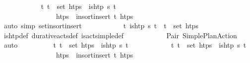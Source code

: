 \begin{isabellebody}
\ \ \ \ \ \ \ \ \ \ \isamarkupfalse%
\ {\isacartoucheopen}{\isasymforall}t{\isachardot}{\kern0pt}\ t\ {\isasymin}\ set\ htps{\isacharprime}{\kern0pt}\ {\isasymlongleftrightarrow}\ is{\isacharunderscore}{\kern0pt}htp\ {\isasympi}s\ t{\isacartoucheclose}\ \isanewline
\ \ \ \ \ \ \ \ \ \ \ \ \ \ \ \ {\isacartoucheopen}htps\ {\isacharequal}{\kern0pt}\ insort{\isacharunderscore}{\kern0pt}insert\ t\isactrlsub {\isasympi}\ htps{\isacharprime}{\kern0pt}{\isacartoucheclose}\ \isanewline
\ \ \ \ \ \ \ \ \ \ \isamarkupfalse%
\ {\isacharparenleft}{\kern0pt}auto\ simp{\isacharcolon}{\kern0pt}\ set{\isacharunderscore}{\kern0pt}insort{\isacharunderscore}{\kern0pt}insert{\isacharparenright}{\kern0pt}\isanewline
\ \ \ \ \ \ \ \ \isamarkupfalse%
\ \isamarkupfalse%
\ {\isachardoublequoteopen}{\isasymforall}t{\isachardot}{\kern0pt}\ is{\isacharunderscore}{\kern0pt}htp\ {\isacharparenleft}{\kern0pt}{\isasympi}{\isacharhash}{\kern0pt}{\isasympi}s{\isacharparenright}{\kern0pt}\ t\ {\isasymlongrightarrow}\ t\ {\isasymin}\ set\ htps{\isachardoublequoteclose}\isanewline
\ \ \ \ \ \ \ \ \ \ \isamarkupfalse%
\ is{\isacharunderscore}{\kern0pt}htp{\isacharunderscore}{\kern0pt}def\ durative{\isacharunderscore}{\kern0pt}acts{\isacharunderscore}{\kern0pt}def\ is{\isacharunderscore}{\kern0pt}act{\isacharunderscore}{\kern0pt}simple{\isacharunderscore}{\kern0pt}def\isanewline
\ \ \ \ \ \ \ \ \ \ \isamarkupfalse%
\ Pair\ Simple{\isacharunderscore}{\kern0pt}Plan{\isacharunderscore}{\kern0pt}Action\ \isamarkupfalse%
\ auto\isanewline
\ \ \ \ \ \ \ \ \isamarkupfalse%
\ {\isachardoublequoteopen}{\isasymforall}t{\isachardot}{\kern0pt}\ t\ {\isasymin}\ set\ htps\ {\isasymlongrightarrow}\ is{\isacharunderscore}{\kern0pt}htp\ {\isacharparenleft}{\kern0pt}{\isasympi}{\isacharhash}{\kern0pt}{\isasympi}s{\isacharparenright}{\kern0pt}\ t{\isachardoublequoteclose}\isanewline
\ \ \ \ \ \ \ \ \ \ \isamarkupfalse%
\ {\isacartoucheopen}{\isasymforall}t{\isachardot}{\kern0pt}\ t\ {\isasymin}\ set\ htps{\isacharprime}{\kern0pt}\ {\isasymlongrightarrow}\ is{\isacharunderscore}{\kern0pt}htp\ {\isacharparenleft}{\kern0pt}{\isasympi}{\isacharhash}{\kern0pt}{\isasympi}s{\isacharparenright}{\kern0pt}\ t{\isacartoucheclose}\ \isanewline
\ \ \ \ \ \ \ \ \ \ \ \ \ \ \ \ {\isacartoucheopen}htps\ {\isacharequal}{\kern0pt}\ insort{\isacharunderscore}{\kern0pt}insert\ t\isactrlsub {\isasympi}\ htps{\isacharprime}{\kern0pt}{\isacartoucheclose}\ \isanewline

\end{isabellebody}
